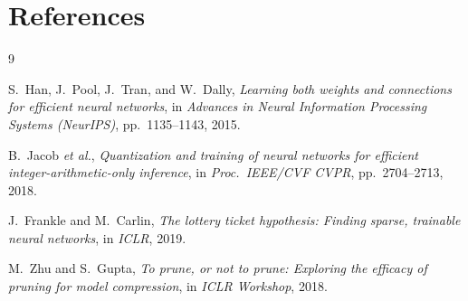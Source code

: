 \section{References}
\begingroup
\renewcommand{\section}[2]{}   %
\begin{thebibliography}{9}

S.~Han, J.~Pool, J.~Tran, and W.~Dally,
\textit{Learning both weights and connections for efficient neural networks},
in \textit{Advances in Neural Information Processing Systems (NeurIPS)},
pp.~1135--1143, 2015.

B.~Jacob \textit{et al.},
\textit{Quantization and training of neural networks for efficient
integer-arithmetic-only inference},
in \textit{Proc.\ IEEE/CVF CVPR}, pp.~2704--2713, 2018.

J.~Frankle and M.~Carlin,
\textit{The lottery ticket hypothesis: Finding sparse, trainable neural networks},
in \textit{ICLR}, 2019.

M.~Zhu and S.~Gupta,
\textit{To prune, or not to prune: Exploring the efficacy of pruning for
model compression},
in \textit{ICLR Workshop}, 2018.

\end{thebibliography}
\endgroup
